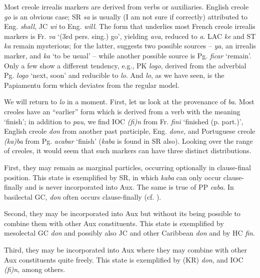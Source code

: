 Most creole irrealis markers are derived from verbs or auxiliaries. English creole \textit{go} is an obvious case; SR \textit{sa} is usually (I am not sure if correctly) attributed to Eng. \textit{shall}, JC \textit{wi} to Eng. \textit{will}. The form that underlies most French creole irrealis markers is Fr. \textit{va} `(3rd pers. sing.) go', yielding \textit{ava}, reduced to \textit{a}. LAC \textit{ke} and ST \textit{ka} remain mysterious; for the latter, \citet{Ferraz1979} suggests two possible sources --  \textit{ya}, an irrealis marker, and  \textit{ka} `to be usual' -- while another possible source is Pg. \textit{ficar} `remain'. Only a few  show a different tendency, e.g., PK \textit{logo}, derived from the adverbial Pg. \textit{logo} `next,
soon' and reducible to \textit{lo}. And \textit{lo}, as we have seen, is the Papiamentu form which deviates from the regular model.

We will return to \textit{lo} in a moment. First, let us look at the prove\-nance of \textit{ba}. Most creoles have an ``earlier'' form which is derived from a verb with the meaning `finish'; in addition to \textit{pau}, we find IOC \textit{(fi)n} from Fr. \textit{fini} `finished (p. part.)', English creole \textit{don} from another past participle, Eng. \textit{done}, and Portuguese creole \textit{(ka)ba} from Pg. \textit{acabar} `finish' (\textit{kaba} is found in SR also). Looking over the range of creoles, it would seem that such markers can have three distinct distributions.

First, they may remain as marginal particles, occurring option\-ally in clause-final position. This state is exemplified by SR, in which \textit{kaba} can only occur clause-finally and is never incorporated into Aux. The same is true of PP \textit{caba}. In basilectal GC, \textit{don} often occurs clause-finally (cf. \citealt[Examples 2.65--67]{Bickerton1975}).

Second, they may be incorporated into Aux but without its being possible to combine them with other Aux constituents. This state is exemplified by mesolectal GC \textit{don} and possibly also JC and other Caribbean \textit{don} and by HC \textit{fin}.

Third, they may be incorporated into Aux where they may combine with other Aux constituents quite freely. This state is exem\-plified by  (KR) \textit{don}, and IOC \textit{(fi)n}, among others.

